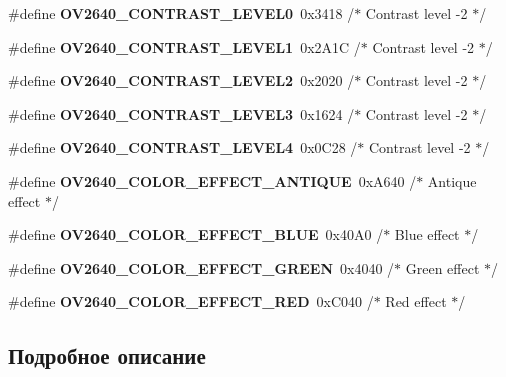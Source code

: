 \begin{DoxyCompactItemize}
\mbox{\label{group___o_v2640___exported___constants_ga6bfb90ee774ebcd8814e424475dacf45}} 
\#define {\bfseries O\+V2640\+\_\+\+C\+O\+N\+T\+R\+A\+S\+T\+\_\+\+L\+E\+V\+E\+L0}~0x3418 /$\ast$ Contrast level -\/2           $\ast$/
\item 
\mbox{\label{group___o_v2640___exported___constants_ga1d9a590135b1f13cba224ad5816feb7f}} 
\#define {\bfseries O\+V2640\+\_\+\+C\+O\+N\+T\+R\+A\+S\+T\+\_\+\+L\+E\+V\+E\+L1}~0x2\+A1\+C /$\ast$ Contrast level -\/2           $\ast$/
\item 
\mbox{\label{group___o_v2640___exported___constants_gadf5feafb2a7b58d7e41010d0c5b82a2e}} 
\#define {\bfseries O\+V2640\+\_\+\+C\+O\+N\+T\+R\+A\+S\+T\+\_\+\+L\+E\+V\+E\+L2}~0x2020 /$\ast$ Contrast level -\/2           $\ast$/
\item 
\mbox{\label{group___o_v2640___exported___constants_gadaab4db5ab187aeb1855454cea24edfa}} 
\#define {\bfseries O\+V2640\+\_\+\+C\+O\+N\+T\+R\+A\+S\+T\+\_\+\+L\+E\+V\+E\+L3}~0x1624 /$\ast$ Contrast level -\/2           $\ast$/
\item 
\mbox{\label{group___o_v2640___exported___constants_ga66205d434f676a8e1db1583581101313}} 
\#define {\bfseries O\+V2640\+\_\+\+C\+O\+N\+T\+R\+A\+S\+T\+\_\+\+L\+E\+V\+E\+L4}~0x0\+C28 /$\ast$ Contrast level -\/2           $\ast$/
\item 
\mbox{\label{group___o_v2640___exported___constants_ga40f9f6a21cde49f9bda8047480c3ceb9}} 
\#define {\bfseries O\+V2640\+\_\+\+C\+O\+L\+O\+R\+\_\+\+E\+F\+F\+E\+C\+T\+\_\+\+A\+N\+T\+I\+Q\+UE}~0x\+A640 /$\ast$ Antique effect              $\ast$/
\item 
\mbox{\label{group___o_v2640___exported___constants_gafc4dee162a4a0569637c1be9bd5aa667}} 
\#define {\bfseries O\+V2640\+\_\+\+C\+O\+L\+O\+R\+\_\+\+E\+F\+F\+E\+C\+T\+\_\+\+B\+L\+UE}~0x40\+A0 /$\ast$ Blue effect                 $\ast$/
\item 
\mbox{\label{group___o_v2640___exported___constants_ga4d06265dfeb3477a41ff9c41c1e64433}} 
\#define {\bfseries O\+V2640\+\_\+\+C\+O\+L\+O\+R\+\_\+\+E\+F\+F\+E\+C\+T\+\_\+\+G\+R\+E\+EN}~0x4040 /$\ast$ Green effect                $\ast$/
\item 
\mbox{\label{group___o_v2640___exported___constants_ga83938c0ffb6e3de2f1d8273efa96bd3f}} 
\#define {\bfseries O\+V2640\+\_\+\+C\+O\+L\+O\+R\+\_\+\+E\+F\+F\+E\+C\+T\+\_\+\+R\+ED}~0x\+C040 /$\ast$ Red effect                  $\ast$/
\end{DoxyCompactItemize}


\subsection{Подробное описание}
